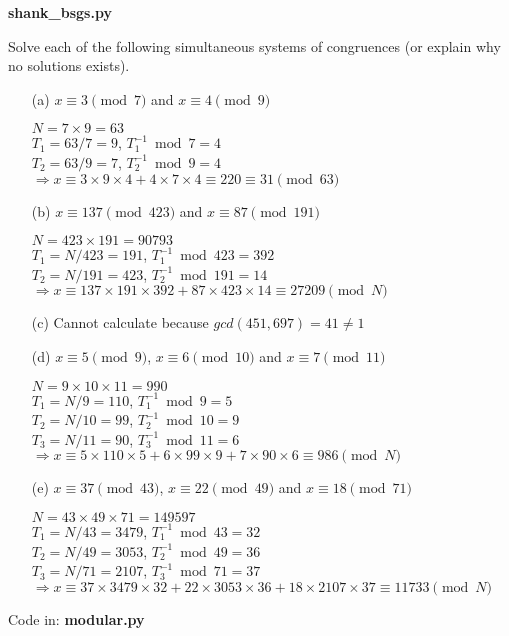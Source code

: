 \begin{exer}[2.17]
\textbf{shank\_bsgs.py}
\end{exer}

\begin{exer}[2.18]
Solve each of the following simultaneous systems of congruences (or explain why no solutions exists).

\begin{enumerate}
    \item [(a)] $x \equiv 3 \pmod 7$ and $x \equiv 4 \pmod 9$
    
    $N=7 \times 9=63$ \\ $T_1=63/7=9$, $T_1^{-1} \bmod 7 = 4$ \\ $T_2=63/9=7$, $T_2^{-1} \bmod 9 = 4$ \\ $\Rightarrow x \equiv 3 \times 9 \times 4 + 4 \times 7 \times 4 \equiv 220 \equiv 31 \pmod {63}$
    
    \item [(b)] $x \equiv 137 \pmod {423}$ and $x \equiv 87 \pmod {191}$
    
    $N=423 \times 191=90793$ \\ $T_1=N/423=191$, $T_1^{-1} \bmod 423 = 392$ \\ $T_2=N/191=423$, $T_2^{-1} \bmod 191 = 14$ \\ $\Rightarrow x \equiv 137 \times 191 \times 392 + 87 \times 423 \times 14 \equiv 27209 \pmod N$
    
    \item [(c)] Cannot calculate because $gcd(451, 697)=41 \neq 1$
    
    \item [(d)] $x \equiv 5 \pmod 9$, $x \equiv 6 \pmod {10}$ and $x \equiv 7 \pmod {11}$
    
    $N=9 \times 10 \times 11 = 990$ \\ $T_1=N/9=110$, $T_1^{-1} \bmod 9 = 5$ \\ $T_2=N/10=99$, $T_2^{-1} \bmod 10=9$ \\ $T_3=N/11=90$, $T_3^{-1} \bmod 11 = 6$ \\ $\Rightarrow x \equiv 5 \times 110 \times 5 + 6 \times 99 \times 9 + 7 \times 90 \times 6 \equiv 986 \pmod N$
    
    \item [(e)] $x \equiv 37 \pmod {43}$, $x \equiv 22 \pmod {49}$ and $x \equiv 18 \pmod {71}$
    
    $N=43 \times 49 \times 71=149597$ \\ $T_1=N/43=3479$, $T_1^{-1} \bmod 43 = 32$ \\ $T_2=N/49=3053$, $T_2^{-1} \bmod 49=36$ \\ $T_3=N/71=2107$, $T_3^{-1} \bmod 71 = 37$ \\ $\Rightarrow x \equiv 37 \times 3479 \times 32 + 22 \times 3053 \times 36 + 18  \times 2107 \times 37 \equiv 11733 \pmod N$
\end{enumerate}

Code in: \textbf{modular.py}
\end{exer}

